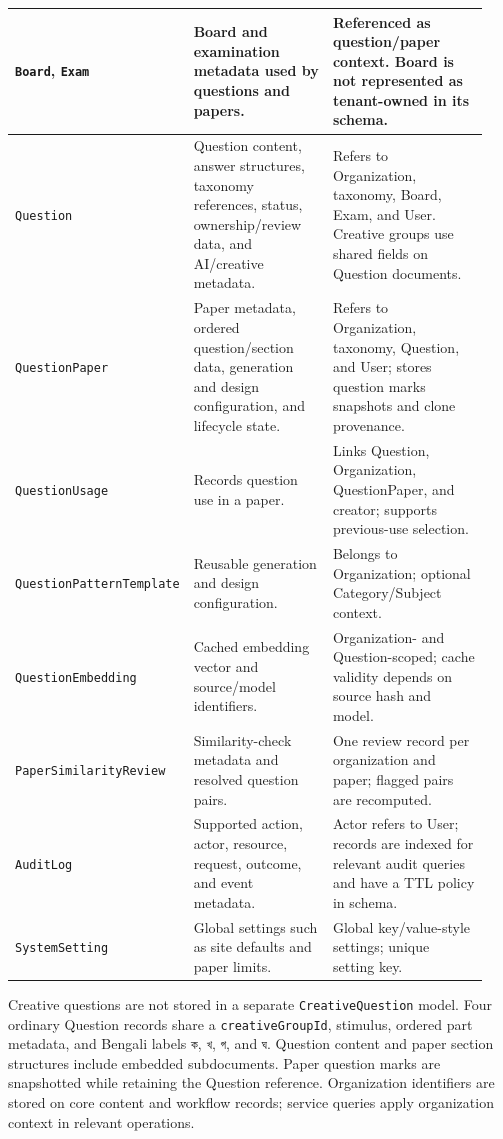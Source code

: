 \begin{table}[H]
\begin{tabular}{|p{0.30\linewidth}|p{0.30\linewidth}|p{0.34\linewidth}|}
        \hline
        \texttt{Board}, \texttt{Exam} & Board and examination metadata used by questions and papers. & Referenced as question/paper context. Board is not represented as tenant-owned in its schema. \\
        \hline
        \texttt{Question} & Question content, answer structures, taxonomy references, status, ownership/review data, and AI/creative metadata. & Refers to Organization, taxonomy, Board, Exam, and User. Creative groups use shared fields on Question documents. \\
        \hline
        \texttt{QuestionPaper} & Paper metadata, ordered question/section data, generation and design configuration, and lifecycle state. & Refers to Organization, taxonomy, Question, and User; stores question marks snapshots and clone provenance. \\
        \hline
        \texttt{QuestionUsage} & Records question use in a paper. & Links Question, Organization, QuestionPaper, and creator; supports previous-use selection. \\
        \hline
        \texttt{QuestionPatternTemplate} & Reusable generation and design configuration. & Belongs to Organization; optional Category/Subject context. \\
        \hline
        \texttt{QuestionEmbedding} & Cached embedding vector and source/model identifiers. & Organization- and Question-scoped; cache validity depends on source hash and model. \\
        \hline
        \texttt{PaperSimilarityReview} & Similarity-check metadata and resolved question pairs. & One review record per organization and paper; flagged pairs are recomputed. \\
        \hline
        \texttt{AuditLog} & Supported action, actor, resource, request, outcome, and event metadata. & Actor refers to User; records are indexed for relevant audit queries and have a TTL policy in schema. \\
        \hline
        \texttt{SystemSetting} & Global settings such as site defaults and paper limits. & Global key/value-style settings; unique setting key. \\
        \hline
    \end{tabular}
\end{table}

Creative questions are not stored in a separate \texttt{CreativeQuestion} model. Four ordinary Question records share a \texttt{creativeGroupId}, stimulus, ordered part metadata, and Bengali labels \texttt{ক}, \texttt{খ}, \texttt{গ}, and \texttt{ঘ}. Question content and paper section structures include embedded subdocuments. Paper question marks are snapshotted while retaining the Question reference. Organization identifiers are stored on core content and workflow records; service queries apply organization context in relevant operations.

